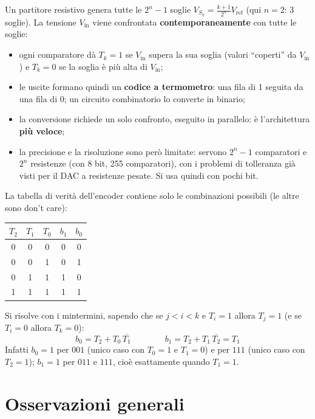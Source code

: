 \noindent Un partitore resistivo genera tutte le $2^n-1$ soglie
$V_{S_k} = \frac{k+1}{2^n}V_{\text{ref}}$ (qui $n=2$: 3 soglie). La tensione $V_{\text{in}}$
viene confrontata \textbf{contemporaneamente} con tutte le soglie:
\begin{itemize}[leftmargin=1.5em, itemsep=2pt]
    \item ogni comparatore dà $T_k = 1$ se $V_{\text{in}}$ supera la sua soglia (valori
          ``coperti'' da $V_{\text{in}}$) e $T_k=0$ se la soglia è più alta di $V_{\text{in}}$;
    \item le uscite formano quindi un \textbf{codice a termometro}: una fila di 1 seguita da
          una fila di 0; un circuito combinatorio lo converte in binario;
    \item la conversione richiede un solo confronto, eseguito in parallelo: è
          l'architettura \textbf{più veloce};
    \item la precisione e la risoluzione sono però limitate: servono $2^n-1$ comparatori e
          $2^n$ resistenze (con 8 bit, 255 comparatori), con i problemi di tolleranza già
          visti per il DAC a resistenze pesate. Si usa quindi con pochi bit.
\end{itemize}

\noindent La tabella di verità dell'encoder contiene solo le combinazioni possibili (le
altre sono don't care):

\begin{center}
\begin{tabular}{ccc|cc}
\toprule
$T_2$ & $T_1$ & $T_0$ & $b_1$ & $b_0$ \\
\midrule
0 & 0 & 0 & 0 & 0 \\
0 & 0 & 1 & 0 & 1 \\
0 & 1 & 1 & 1 & 0 \\
1 & 1 & 1 & 1 & 1 \\
\bottomrule
\end{tabular}
\end{center}

\noindent Si risolve con i mintermini, sapendo che se $j < i < k$ e $T_i = 1$ allora
$T_j = 1$ (e se $T_i=0$ allora $T_k = 0$):
\[
b_0 = T_2 + T_0\,\overline{T_1} \qquad\qquad b_1 = T_2 + T_1\,\overline{T_2} = T_1
\]
Infatti $b_0=1$ per $001$ (unico caso con $T_0=1$ e $T_1=0$) e per $111$ (unico caso con
$T_2=1$); $b_1=1$ per $011$ e $111$, cioè esattamente quando $T_1=1$.

\section{Osservazioni generali}


